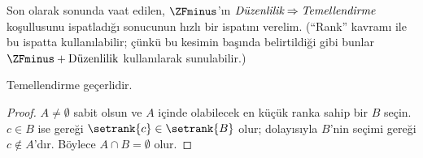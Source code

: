 Son olarak  sonunda vaat edilen, $\ZFminus$'ın
$\emph{Düzenlilik}\Rightarrow\emph{Temellendirme}$ koşullusunu
ispatladığı sonucunun hızlı bir ispatını verelim. (``Rank'' kavramı ile
 bu ispatta kullanılabilir; çünkü bu kesimin
başında belirtildiği gibi bunlar $\ZFminus+\text{Düzenlilik}$ kullanılarak
sunulabilir.)

\begin{prop}
Temellendirme geçerlidir.
\end{prop}

\begin{proof}
$A\neq\emptyset$ sabit olsun ve $A$ içinde olabilecek en küçük ranka sahip
bir $B$ seçin. $c\in B$ ise  gereği
$\setrank{c}\in\setrank{B}$ olur; dolayısıyla $B$'nin seçimi gereği
$c\notin A$'dır. Böylece $A\cap B=\emptyset$ olur.
\end{proof}

